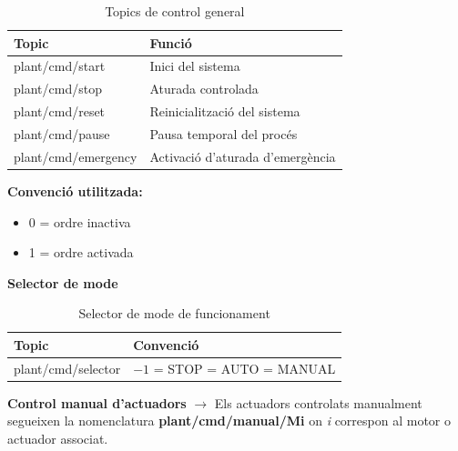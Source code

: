 \documentclass[a4paper,11pt,DIV=13,headings=normal,abstract=true,twoside=semi]{article}
\begin{document}
\begin{table}[H]
\centering
\small
\caption{Topics de control general}
\label{tab:mqtt_general_cmd}
\begin{tabular}{|p{5cm}|p{8cm}|}
\hline
\textbf{Topic} & \textbf{Funció} \\ \hline

plant/cmd/start & Inici del sistema \\ \hline

plant/cmd/stop & Aturada controlada \\ \hline

plant/cmd/reset & Reinicialització del sistema \\ \hline

plant/cmd/pause & Pausa temporal del procés \\ \hline

plant/cmd/emergency & Activació d'aturada d'emergència \\ \hline

\end{tabular}

\end{table}

\textbf{Convenció utilitzada:}

\begin{itemize}
\item 0 = ordre inactiva
\item 1 = ordre activada
\end{itemize}

\textbf{Selector de mode}

\begin{table}[H]
\centering
\small
\caption{Selector de mode de funcionament}
\label{tab:mqtt_selector}
\begin{tabular}{|p{5cm}|p{8cm}|}
\hline
\textbf{Topic} & \textbf{Convenció} \\ \hline

plant/cmd/selector &
$-1$ = STOP \newline
0 = AUTO \newline
1 = MANUAL \\ \hline

\end{tabular}

\end{table}

\textbf{Control manual d'actuadors} $\rightarrow$ Els actuadors controlats manualment segueixen la nomenclatura \textbf{plant/cmd/manual/Mi} on \emph{i} correspon al motor o actuador associat.
\end{document}
